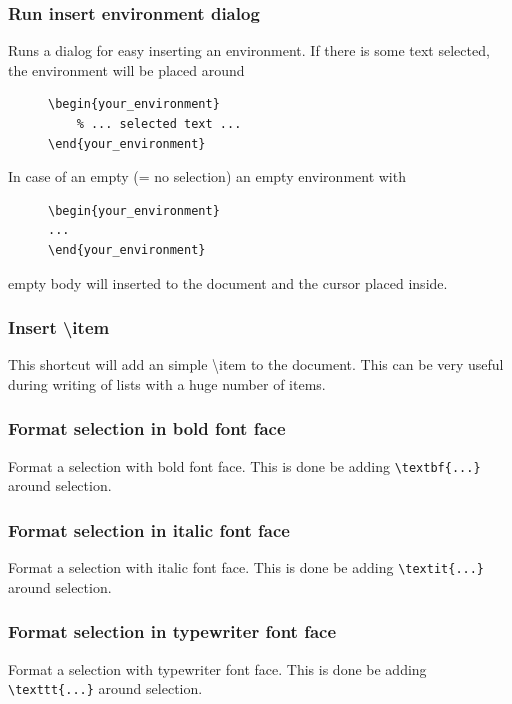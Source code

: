 \documentclass[%
a4paper,%
10pt,%
oneside,%
DIV18,
headsepline,
plainheadsepline,
footsepline,
plainfootsepline,
bibtotoc,%
liststotoc,%
BCOR12mm,%
halfparskip,%
openany,%
]{scrartcl}
\begin{document}
\subsubsection{Run insert environment dialog}
Runs a dialog for easy inserting an environment. If there is some text
selected, the environment will be placed around
\begin{figure}[h!]
\begin{lstlisting}
\begin{your_environment}
	% ... selected text ...
\end{your_environment}
\end{lstlisting}
\end{figure}

In case of an empty (= no selection) an empty environment with
\begin{figure}[h!]
\begin{lstlisting}
\begin{your_environment}
...
\end{your_environment}
\end{lstlisting}
\end{figure}
empty body will inserted to the document and the cursor placed inside.

\subsubsection{Insert \textbackslash item}
This shortcut will add an simple \textbackslash item to the document.
This can be very useful during writing of lists with a huge number of
items.

\subsubsection{Format selection in bold font face}
Format a selection with bold font face. This is done be adding
\texttt{\textbackslash textbf\{...\}} around selection.

\subsubsection{Format selection in italic font face}
Format a selection with italic font face. This is done be adding
\texttt{\textbackslash textit\{...\}} around selection.

\subsubsection{Format selection in typewriter font face}
Format a selection with typewriter font face. This is done be adding
\texttt{\textbackslash texttt\{...\}} around selection.
\end{document}

